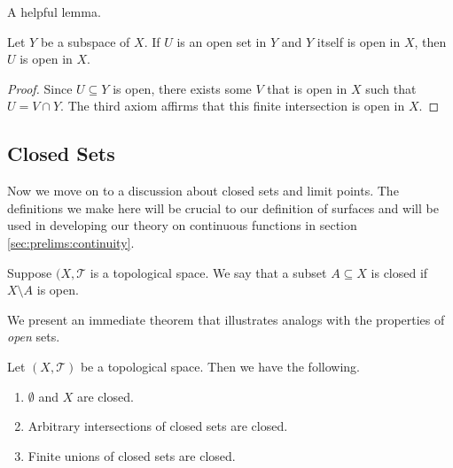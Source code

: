 A helpful lemma. %

\begin{lem}
  Let $Y$ be a subspace of $X$. If $U$ is an open set in $Y$ and $Y$
  itself is open in $X$, then $U$ is open in $X$.
\end{lem}

\begin{proof}
  Since $U \subseteq Y$ is open, there exists some $V$ that is open in
  $X$ such that $U = V \cap Y$. The third axiom affirms that this
  finite intersection is open in $X$. 
\end{proof}


\subsection{Closed Sets}
\label{sec:prelims:closed}

Now we move on to a discussion about closed sets and limit points. The
definitions we make here will be crucial to our definition of surfaces
and will be used in developing our theory on continuous functions in
section \ref{sec:prelims:continuity}.

\begin{defn}
  Suppose $(X,\mathscr{T}$ is a topological space. We say that a
  subset $A \subseteq X$ is closed if $X \setminus A$ is open.
\end{defn}

We present an immediate theorem that illustrates analogs with the
properties of \emph{open} sets.

\begin{thm}
  Let $(X,\mathscr{T})$ be a topological space. Then we have the
  following. 
  \begin{enumerate}
  \item $\emptyset$ and $X$ are closed.
  \item Arbitrary intersections of closed sets are closed.
  \item Finite unions of closed sets are closed.
  \end{enumerate}
\end{thm}

